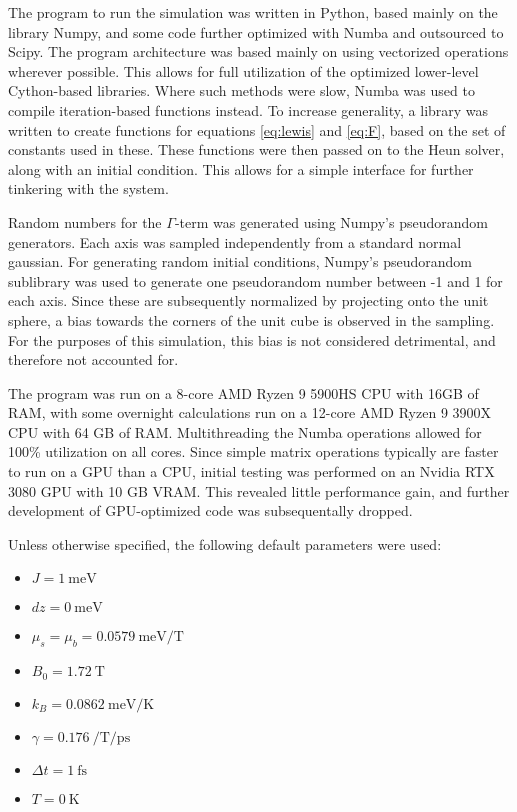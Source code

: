 The program to run the simulation was written in Python, based mainly on the library Numpy,
and some code further optimized with Numba and outsourced to Scipy. 
The program architecture was based mainly on using vectorized operations wherever possible. 
This allows for full utilization of the optimized lower-level Cython-based libraries. Where such methods were slow,
Numba was used to compile iteration-based functions instead.
To increase generality, a library was written to create functions for equations 
\ref{eq:lewis} and \ref{eq:F}, based on the set of constants used in these. 
These functions were then passed on to the Heun solver, along with an initial condition.
This allows for a simple interface for further tinkering with the system.

Random numbers for the $\Gamma$-term was generated using Numpy's pseudorandom generators.
Each axis was sampled independently from a standard normal gaussian.
For generating random initial conditions, Numpy's pseudorandom sublibrary was used to generate
one pseudorandom number between -1 and 1 for each axis. Since these are subsequently normalized by projecting
onto the unit sphere, a bias towards the corners of the unit cube is observed in the sampling.
For the purposes of this simulation, this bias is not considered detrimental, and therefore not accounted for.

The program was run on a 8-core AMD Ryzen 9 5900HS CPU with 16GB of RAM, 
with some overnight calculations run on a 12-core AMD Ryzen 9 3900X CPU with 64 GB of RAM.
Multithreading the Numba operations allowed for 100\% utilization on all cores.
Since simple matrix operations typically are faster to run on a GPU than a CPU,
initial testing was performed on an Nvidia RTX 3080 GPU with 10 GB VRAM. This revealed little performance gain, 
and further development of GPU-optimized code was subsequentally dropped.

Unless otherwise specified, the following default parameters were used: 
\begin{itemize}
    \item $J = \SI{1}{\milli\electronvolt}$
    \item $dz = \SI{0}{\milli\electronvolt}$
    \item $\mu_s = \mu_b = \SI{0.0579}{\milli\electronvolt\per\tesla}$
    \item $B_0 = \SI{1.72}{\tesla}$
    \item $k_B = \SI{0.0862}{\milli\electronvolt\per\kelvin}$
    \item $\gamma = \SI{0.176}{\per\tesla\per\pico\second}$
    \item $\Delta t = \SI{1}{\femto\second}$
    \item $T = \SI{0}{\kelvin}$
\end{itemize}
